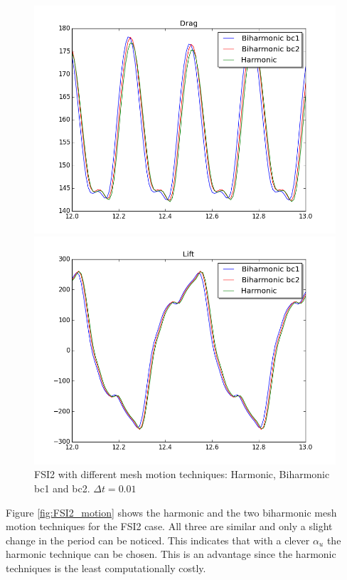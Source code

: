 \begin{figure}[H]
\begin{minipage}[b]{0.5\linewidth}
    \centering
    \includegraphics[scale=0.35]{./Verification_Validation/Mesh_motion_results/FSI2_dt001_drag.png} 
    \vspace{4ex}
  \end{minipage}%
  \begin{minipage}[b]{0.5\linewidth}
    \centering
    \includegraphics[scale=0.35]{./Verification_Validation/Mesh_motion_results/FSI2_dt001_lift.png} 
    \vspace{4ex}
  \end{minipage} 
\caption {FSI2 with different mesh motion techniques: Harmonic, Biharmonic bc1 and bc2. $\Delta t = 0.01$}
\end{figure}

Figure \ref{fig:FSI2_motion} shows the harmonic and the two biharmonic mesh motion techniques for the FSI2 case. All three are similar and only a slight change in the period can be noticed. This indicates that with a clever $\alpha_u$ the harmonic technique can be chosen. This is an advantage since the harmonic techniques is the least computationally costly.








